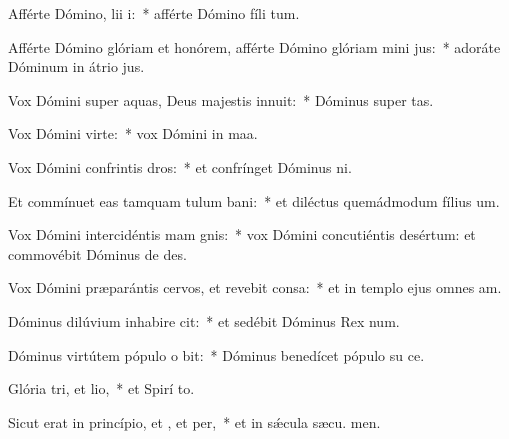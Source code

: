 \item Afférte Dómino, lii i:~* afférte Dómino fíli tum.
\item Afférte Dómino glóriam et honórem, afférte Dómino glóriam mini jus:~* adoráte Dóminum in átrio  jus.
\item Vox Dómini super aquas, Deus majestis innuit:~* Dóminus super  tas.
\item Vox Dómini  virte:~* vox Dómini in maa.
\item Vox Dómini confrintis dros:~* et confrínget Dóminus  ni.
\item Et commínuet eas tamquam tulum bani:~* et diléctus quemádmodum fílius um.
\item Vox Dómini intercidéntis mam gnis:~* vox Dómini concutiéntis desértum: et commovébit Dóminus de des.
\item Vox Dómini præparántis cervos, et revebit consa:~* et in templo ejus omnes  am.
\item Dóminus dilúvium inhabire cit:~* et sedébit Dóminus Rex  num.
\item Dóminus virtútem pópulo o bit:~* Dóminus benedícet pópulo su  ce.
\item Glória tri, et lio,~* et Spirí to.
\item Sicut erat in princípio, et , et per,~* et in sǽcula sæcu. men.
